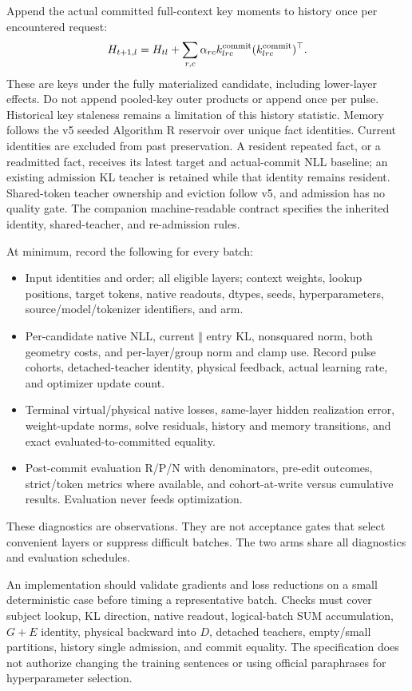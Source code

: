 \documentclass[10pt]{article}
\begin{document}
Append the actual committed full-context key moments to history once
per encountered request:
\[
 H_{t+1,l}=H_{tl}+\sum_{r,c}\alpha_{rc}
 k^{\rm commit}_{lrc}(k^{\rm commit}_{lrc})^\top.
\]
These are keys under the fully materialized candidate, including
lower-layer effects. Do not append pooled-key outer products or append
once per pulse. Historical key staleness remains a limitation of this
history statistic. Memory follows the v5 seeded Algorithm R reservoir
over unique fact identities. Current identities are excluded from past
preservation. A resident repeated fact, or a readmitted fact, receives
its latest target and actual-commit NLL baseline; an existing admission
KL teacher is retained while that identity remains resident. Shared-token
teacher ownership and eviction follow v5, and admission has no quality
gate. The companion machine-readable contract specifies the inherited
identity, shared-teacher, and re-admission rules.

At minimum, record the following for every batch:
\begin{itemize}
\item Input identities and order; all eligible layers; context weights,
      lookup positions, target tokens, native readouts, dtypes, seeds,
      hyperparameters, source/model/tokenizer identifiers, and arm.
\item Per-candidate native NLL, current $\Vert$ entry KL, nonsquared
      norm, both geometry costs, and per-layer/group norm and clamp use.
      Record pulse cohorts, detached-teacher identity, physical feedback,
      actual learning rate, and optimizer update count.
\item Terminal virtual/physical native losses, same-layer hidden
      realization error, weight-update norms, solve residuals, history
      and memory transitions, and exact evaluated-to-committed equality.
\item Post-commit evaluation R/P/N with denominators, pre-edit outcomes,
      strict/token metrics where available, and cohort-at-write versus
      cumulative results. Evaluation never feeds optimization.
\end{itemize}
These diagnostics are observations. They are not acceptance gates that
select convenient layers or suppress difficult batches. The two arms
share all diagnostics and evaluation schedules.

An implementation should validate gradients and loss reductions on a
small deterministic case before timing a representative batch. Checks
must cover subject lookup, KL direction, native readout, logical-batch
SUM accumulation, $G+E$ identity, physical backward into $D$, detached
teachers, empty/small partitions, history single admission, and commit
equality. The specification does not authorize changing the training
sentences or using official paraphrases for hyperparameter selection.
\end{document}
